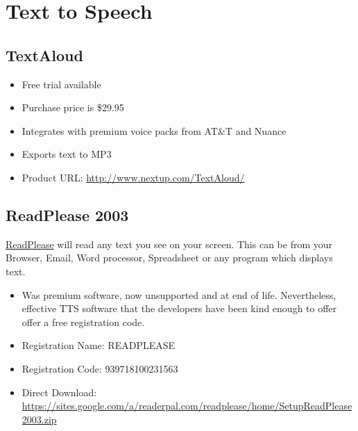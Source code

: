 \documentclass[letterpaper,10pt,english]{sphinxmanual}
\begin{document}
\section{Text to Speech}
\label{resources:text-to-speech}

\subsection{TextAloud}
\label{resources:textaloud}\begin{itemize}
\item {} 
Free trial available

\item {} 
Purchase price is \$29.95

\item {} 
Integrates with premium voice packs from AT\&T and Nuance

\item {} 
Exports text to MP3

\item {} 
Product URL: \href{http://www.nextup.com/TextAloud/}{http://www.nextup.com/TextAloud/}

\end{itemize}


\subsection{ReadPlease 2003}
\label{resources:readplease-2003}
\href{https://sites.google.com/a/readerpal.com/readplease/}{ReadPlease} will read any text you see on your screen. This can be from your Browser, Email, Word processor, Spreadsheet or any program which displays text.
\begin{itemize}
\item {} 
Was premium software, now unsupported and at end of life. Nevertheless, effective TTS software that the developers have been kind enough to offer offer a free registration code.

\item {} 
Registration Name: READPLEASE

\item {} 
Registration Code: 939718100231563

\item {} 
Direct Download:  \href{https://sites.google.com/a/readerpal.com/readplease/home/SetupReadPlease2003.zip}{https://sites.google.com/a/readerpal.com/readplease/home/SetupReadPlease2003.zip}

\end{itemize}
\end{document}
